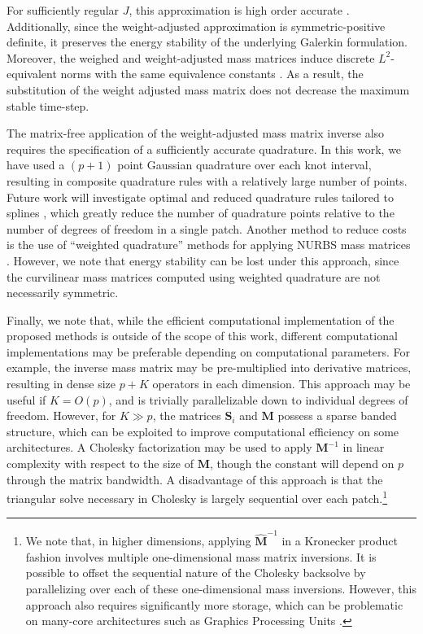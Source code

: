 \documentclass[preprint,10pt]{elsarticle}
\newcommand{\reviewerTwo}[1]{#1}
\begin{document}
For sufficiently regular $J$, this approximation is high order accurate \cite{chan2016weight1,chan2016weight2}.  Additionally, since the weight-adjusted approximation is symmetric-positive definite, it preserves the energy stability of the underlying Galerkin formulation.  Moreover, the weighed and weight-adjusted mass matrices induce discrete $L^2$-equivalent norms with the same equivalence constants \cite{chan2016weight1}.  As a result, the substitution of the weight adjusted mass matrix does not decrease the maximum stable time-step.  

The matrix-free application of the weight-adjusted mass matrix inverse also requires the specification of a sufficiently accurate quadrature.  In this work, we have used a $(p+1)$ point Gaussian quadrature over each knot interval, resulting in composite quadrature rules with a relatively large number of points.  Future work will investigate optimal and reduced quadrature rules tailored to splines \cite{hughes2010efficient, auricchio2012simple, schillinger2014reduced, hiemstra2017optimal}, which greatly reduce the number of quadrature points relative to the number of degrees of freedom in a single patch.  Another method to reduce costs is the use of \reviewerTwo{``weighted quadrature'' methods for applying NURBS mass matrices \cite{calabro2016fast}.  However, we note that energy stability can be lost under this approach, since the curvilinear mass matrices computed using weighted quadrature are not necessarily symmetric}.  

Finally, we note that, while the efficient computational implementation of the proposed methods is outside of the scope of this work, different computational implementations may be preferable depending on computational parameters.  For example, the inverse mass matrix may be pre-multiplied into derivative matrices, resulting in dense size $p+K$ operators in each dimension.  This approach may be useful if $K = O(p)$, and is trivially parallelizable down to individual degrees of freedom.  However, for $K \gg p$, the matrices $\bm{S}_i$ and $\bm{M}$ possess a sparse banded structure, which can be exploited to improve computational efficiency on some architectures.  A Cholesky factorization may be used to apply $\bm{M}^{-1}$ in linear complexity with respect to the size of $\bm{M}$, though the constant will depend on $p$ through the matrix bandwidth.  A disadvantage of this approach is that the triangular solve necessary in Cholesky is largely sequential over each patch.\footnote{\reviewerTwo{We note that, in higher dimensions, applying $\widehat{\bm{M}}^{-1}$ in a Kronecker product fashion involves multiple one-dimensional mass matrix inversions.  It is possible to offset the sequential nature of the Cholesky backsolve by parallelizing over each of these one-dimensional mass inversions.  However, this approach also requires significantly more storage, which can be problematic on many-core architectures such as Graphics Processing Units \cite{chan2017weight}.}}
\end{document}
